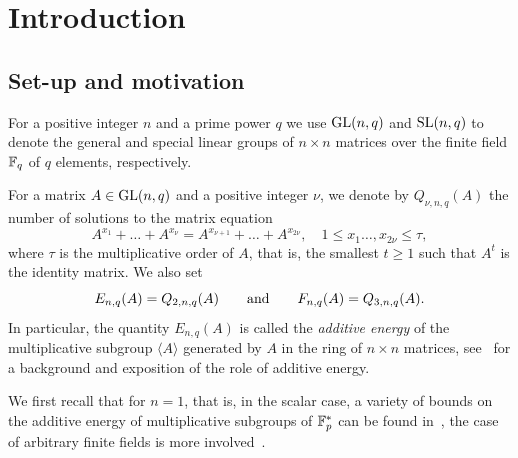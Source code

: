 \documentclass[12pt]{amsart}
\begin{document}


\maketitle

\tableofcontents





\section{Introduction}
\subsection{Set-up and motivation}
For a positive integer $n$ and a prime power $q$  we use $\operatorname{GL}(n,q)$ and $\operatorname{SL}(n,q)$ to denote the
general and special linear groups 
of $n\times n$ matrices over the finite field ${\mathbb F}_q$ of $q$ elements, respectively. 


For a matrix $A \in \operatorname{GL}(n,q)$ and a positive integer $\nu$,  we denote by 
$Q_{\nu,n,q}(A)$ the number of solutions  to the matrix equation 
\begin{equation}
\label{eq:def Q}
A^{x_1} + \ldots +A^{x_\nu} = A^{x_{\nu+1}}  + \ldots + A^{x_{2\nu}} , \quad 1 \le x_1\ldots, x_{2\nu}\le \tau,
\end{equation}
where $\tau$ is the multiplicative order of $A$, that is, the smallest $t\ge1$ such that $A^t$ is the identity  matrix. 
We also set 
\begin{equation}
\label{eq:def E F}
E_{n,q}(A) = Q_{2,n,q}(A) \qquad\mbox{and}\qquad F_{n,q}(A) = Q_{3,n,q}(A). 
\end{equation}
In particular, the quantity
$E_{n,q}(A)$ is called   the {\it additive energy\/} of the multiplicative subgroup $\langle A\rangle$ generated by $A$
in the ring of $n\times n$ matrices, see~\cite{TaVu} for a background and exposition of the
role of additive energy. 


 
 

 We first recall that for $n=1$,  that is, in the scalar case, a variety of bounds on the additive 
 energy of multiplicative subgroups of  ${\mathbb F}_p^*$ can be found in~\cite{HBK,MRSS,Shkr1,Shkr2}, the case 
 of arbitrary finite fields is   more involved~\cite{Moh,Zhel}. 
 
\end{document}
